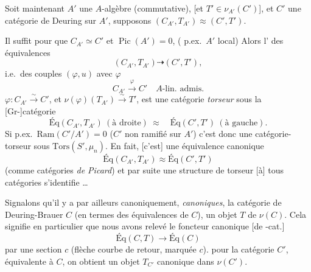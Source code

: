 \documentclass[11pt,a4paper]{article}
\begin{document}
 Soit maintenant $A'$ une $A$-algèbre (commutative), [et
$T' \in \nu_{A'}(C')$],
\struck{\ill{} \ill{} \ill{}}
et $C'$ une catégorie de Deuring sur $A'$, supposons
$(C_{A'}, T_{A'}) \approx (C', T')$.

Il suffit pour  que $C_{A'} \simeq C'$ et
$\operatorname{Pic}(A') = 0$, (\ill{} p.ex.\ $A'$ local) Alors l'\ill{} des
équivalences
\[
  (C_{A'}, T_{A'}) \dashrightarrow (C', T'),
\]
i.e.\ des couples $(\varphi, u)$ avec $\varphi$ 
\[
  C_{A'} \xrightarrow{\ \varphi\ } C' \quad A\text{-lin.\ admis.}
\]
\struck{\ill{}}
$\varphi : C_{A'} \xrightarrow{\sim} C'$, et
$\nu(\varphi)(T_{A'}) \xrightarrow{\sim} T'$, est une catégorie
\emph{torseur} sous la [Gr-]catégorie
\[
  \text{Éq}(C_{A'}, T_{A'}) \ (\text{à droite}) \ \approx\quad
  \text{Éq}(C', T') \ (\text{à gauche}).
\]
Si p.ex.\ $\mathrm{Ram}(C'/A') = 0$ ($C'$ non ramifié sur $A'$)
\struck{\ill{} \ill{}} c'est donc une catégorie-torseur sous
$\mathrm{Tors}(S', \mu_{n})$. En fait, \struck{\ill{}} [c'est]
une équivalence \struck{\ill{}} canonique
\[
  \text{Éq}(C_{A'}, T_{A'}) \approx
  \text{Éq}(C', T')
\]
(comme \ill{} catégories \emph{de Picard}) et par suite
\struck{\ill{}} une structure de torseur [à] tous catégories
 s'identifie \ill{} …

Signalons qu'il y a par ailleurs canoniquement, \ill{} \emph{canoniques},
\ill{} la catégorie de Deuring-Brauer $C$ (en termes des équivalences de
$C$), un objet $T$ de $\nu(C)$. Cela signifie en particulier que nous avons
relevé le foncteur canonique [de -cat.]
\[
  \text{Éq}(C, T) \longrightarrow
  \text{Éq}(C)
\]
par une section $c$ (flèche courbe de retour, marquée $c$).
\ill{} pour la catégorie $C'$, équivalente à $C$, on obtient un objet
$T_{C'}$ canonique dans $\nu(C')$.
\end{document}
